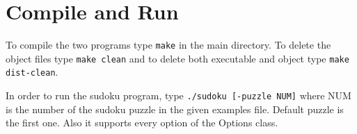 \documentclass[a4paper, 11pt]{article}
\begin{document}
\section{Compile and Run}

To compile the two programs type \texttt{make} in the main
directory. To delete the object files type \texttt{make clean} and to
delete both executable and object type \texttt{make dist-clean}.
	
In order to run the sudoku program, type \texttt{./sudoku [-puzzle
  NUM]} where NUM is the number of the sudoku puzzle in the given
examples file. Default puzzle is the first one. Also it supports every
option of the Options class.
\end{document}
